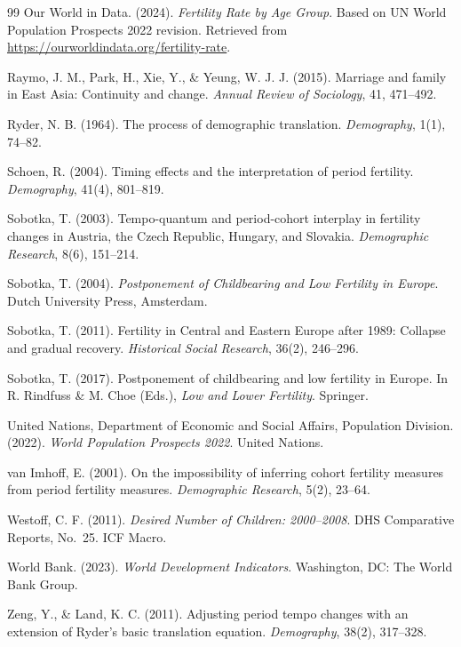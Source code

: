 \documentclass[12pt]{article}
\begin{document}
\begin{thebibliography}{99}
Our World in Data. (2024). \textit{Fertility Rate by Age Group}. Based on
UN World Population Prospects 2022 revision. Retrieved from
\url{https://ourworldindata.org/fertility-rate}.

Raymo, J. M., Park, H., Xie, Y., \& Yeung, W. J. J. (2015). Marriage and
family in East Asia: Continuity and change. \textit{Annual Review of
Sociology}, 41, 471--492.

Ryder, N. B. (1964). The process of demographic translation.
\textit{Demography}, 1(1), 74--82.

Schoen, R. (2004). Timing effects and the interpretation of period fertility.
\textit{Demography}, 41(4), 801--819.

Sobotka, T. (2003). Tempo-quantum and period-cohort interplay in fertility
changes in Austria, the Czech Republic, Hungary, and Slovakia.
\textit{Demographic Research}, 8(6), 151--214.

Sobotka, T. (2004). \textit{Postponement of Childbearing and Low Fertility in
Europe}. Dutch University Press, Amsterdam.

Sobotka, T. (2011). Fertility in Central and Eastern Europe after 1989: Collapse
and gradual recovery. \textit{Historical Social Research}, 36(2), 246--296.

Sobotka, T. (2017). Postponement of childbearing and low fertility in Europe.
In R. Rindfuss \& M. Choe (Eds.), \textit{Low and Lower Fertility}. Springer.

United Nations, Department of Economic and Social Affairs, Population Division.
(2022). \textit{World Population Prospects 2022}. United Nations.

van Imhoff, E. (2001). On the impossibility of inferring cohort fertility
measures from period fertility measures. \textit{Demographic Research},
5(2), 23--64.

Westoff, C. F. (2011). \textit{Desired Number of Children: 2000--2008}.
DHS Comparative Reports, No.\ 25. ICF Macro.

World Bank. (2023). \textit{World Development Indicators}. Washington, DC:
The World Bank Group.

Zeng, Y., \& Land, K. C. (2011). Adjusting period tempo changes with an
extension of Ryder's basic translation equation. \textit{Demography},
38(2), 317--328.

\end{thebibliography}
\end{document}
